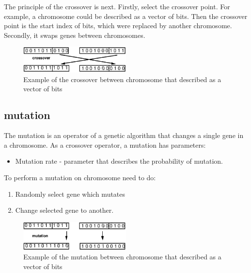 The principle of the crossover is next.
Firstly, select the crossover point. For example, a chromosome could be described as a vector of bits. Then the crossover point is the start index of bits, which were replaced by another chromosome.
Secondly, it swaps genes between chromosomes.

\begin{figure}
	\centering
	\includegraphics[width=0.5\textwidth]{images/crossoverVector.png}
	\caption[Example of the crossover]{Example of the crossover between chromosome that described as a vector of bits}
	\label{fig:crossoverVector}
\end{figure}

\subsection{mutation}\label{sec:GeneticAlgorithmMutation}

The mutation is an operator of a genetic algorithm that changes a single gene in a chromosome. As a crossover operator, a mutation has parameters:

\begin{itemize}
	\item Mutation rate - parameter that describes the probability of mutation.
\end{itemize}

To perform a mutation on chromosome need to do:

\begin{enumerate}
	\item Randomly select gene which mutates
	\item Change selected gene to another.
\end{enumerate}

\begin{figure}
	\centering
	\includegraphics[width=0.5\textwidth]{images/MutationVector.png}
	\caption[Example of the mutation]{Example of the mutation between chromosome that described as a vector of bits}
	\label{fig:MutationVector}
\end{figure}

